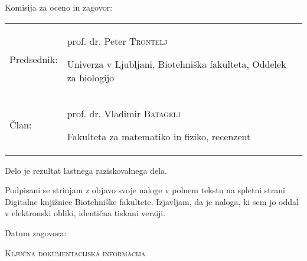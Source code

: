 \vspace{4cm}

Komisija za oceno in zagovor:\\

\begin{table}[ht] %
 \begin{tabular}{>{\raggedright} m{4cm} m{10cm}}
  Predsednik: & prof. dr. Peter \textsc{Trontelj} \par Univerza v Ljubljani, Biotehniška fakulteta, Oddelek za biologijo \\ [10pt]
  Član: & prof. dr. Vladimir \textsc{Batagelj} \par Fakulteta za matematiko in fiziko, recenzent \\ [10pt]
 \end{tabular}
\end{table}

Delo je rezultat lastnega raziskovalnega dela.

Podpisani se strinjam z objavo svoje naloge v polnem tekstu na spletni strani Digitalne knjižnice Biotehniške fakultete. Izjavljam, da je naloga, ki sem jo oddal v elektronski obliki, identična tiskani verziji.\\
\vspace{1cm}

Datum zagovora:

\begin{flushright}
\avtor
\end{flushright}

\newpage
\begin{center}
\textsc{Ključna dokumentacijska informacija} %
\end{center}

